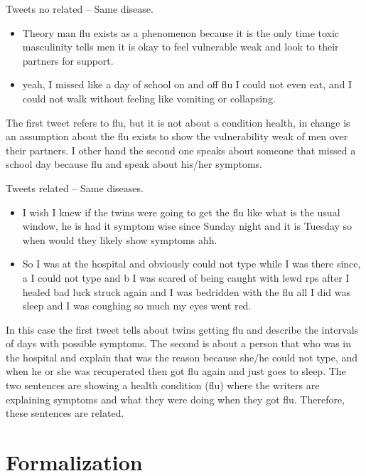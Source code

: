 \documentclass[12pt]{report}
\begin{document}
\begin{definition} Tweets no related – Same disease.
	\begin{itemize}[nolistsep]
		\item Theory man flu exists as a phenomenon because it is the only time toxic masculinity tells men it is okay to feel vulnerable weak and look to their partners for support.
		\item yeah, I missed like a day of school on and off flu I could not even eat, and I could not walk without feeling like vomiting or collapsing.
	\end{itemize}
\end{definition}
The first tweet refers to flu, but it is not about a condition health, in change is an assumption about the flu exists to show the vulnerability weak of men over their partners. I other hand the second one speaks about someone that missed a school day because flu and speak about his/her symptoms.


\begin{definition} Tweets related – Same diseases.
	\begin{itemize}[nolistsep]
		\item I wish I knew if the twins were going to get the flu like what is the usual window, he is had it symptom wise since Sunday night and it is Tuesday so when would they likely show symptoms ahh.
		\item So I was at the hospital and obviously could not type while I was there since, a I could not type and b I was scared of being caught with lewd rps after I healed bad luck struck again and I was bedridden with the flu all I did was sleep and I was coughing so much my eyes went red.
	\end{itemize}
\end{definition}
In this case the first tweet tells about twins getting flu and describe the intervals of days with possible symptoms. The second is about a person that who was in the hospital and explain that was the reason because she/he could not type, and when he or she was recuperated then got flu again and just goes to sleep. The two sentences are showing a health condition (flu) where the writers are explaining symptoms and what they were doing when they got flu. Therefore, these sentences are related.

\section{Formalization}
\end{document}
